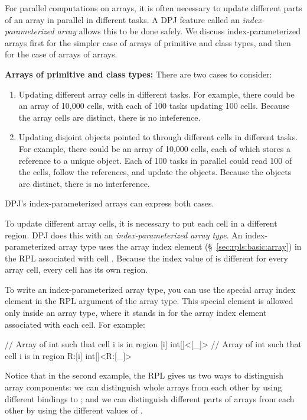 For parallel computations on arrays, it is often necessary to update
different parts of an array in parallel in different tasks.  A DPJ
feature called an \emph{index-parameterized array} allows this to be
done safely.  We discuss index-parameterized arrays first for the
simpler case of arrays of primitive and class types, and then for the
case of arrays of arrays.

\textbf{Arrays of primitive and class types:} There are two cases to
consider:
%
\begin{enumerate}
%
\item Updating different array cells in different tasks.  For example,
  there could be an array of 10,000 cells, with each of 100 tasks
  updating 100 cells.  Because the array cells are distinct, there is
  no inteference.
%
\item Updating disjoint objects pointed to through different cells in
  different tasks.  For example, there could be an array of 10,000
  cells, each of which stores a reference to a unique object.  Each of
  100 tasks in parallel could read 100 of the cells, follow the
  references, and update the objects.  Because the objects are
  distinct, there is no interference.
%
\end{enumerate}
%
DPJ's index-parameterized arrays can express both cases.

 To update different array
cells, it is necessary to put each cell in a different region.  DPJ
does this with an \emph{index-parameterized array type}.  An
index-parameterized array type uses the array index element \kwd{[i]}
(\S~\ref{sec:rpls:basic:array}) in the RPL associated with cell
.  Because the index value of  is different for every
array cell, every cell has its own region.

To write an index-parameterized array type, you can use the special
array index element \kwd{[\_]} in the RPL argument of the array type.
This special element is allowed only inside an array type, where it
stands in for the array index element \kwd{[i]} associated with each
cell.  For example:
%
\begin{dpjlisting}
// Array of int such that cell i is in region [i]
int[]<[_]>
// Array of int such that cell i is in region R:[i]
int[]<R:[_]>
\end{dpjlisting}
%
Notice that in the second example, the RPL  gives us two
ways to distinguish array components:  we can distinguish whole arrays
from each other by using different bindings to ; and we can
distinguish different parts of arrays from each other by using the
different values of .

